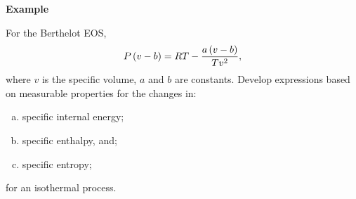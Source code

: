    \begin{MyExample}{\begin{center}{\bf Example}\end{center}}
     \begin{example}\label{Chapter:ThermodynamicPropertiesPureFluids:Example4} \citep{Balmer_Book}
         For the Berthelot EOS,
           \begin{displaymath}
              P\left(v-b\right) = RT - \displaystyle\frac{a\left(v-b\right)}{Tv^{2}},
           \end{displaymath}
         where $v$ is the specific volume, $a$ and $b$ are constants. Develop expressions based on measurable properties for the changes in:
         \begin{enumerate}[a)]
            \item specific internal energy;
            \item specific enthalpy, and;
            \item specific entropy;
         \end{enumerate}
          for an isothermal process.
     \end{example}


\end{MyExample}
